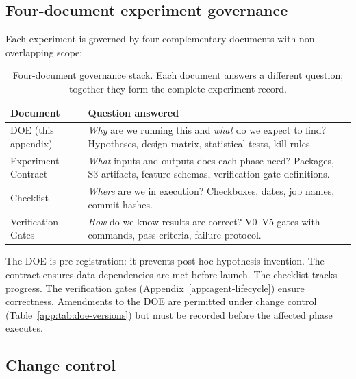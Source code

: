 \subsection{Four-document experiment governance}
\label{app:doe-governance}

Each experiment is governed by four complementary documents with
non-overlapping scope:

\begin{table}[t]
\centering
\caption{Four-document governance stack. Each document answers a different
  question; together they form the complete experiment record.}
\label{app:tab:four-docs}
\small
\begin{tabular}{@{}lp{5.0cm}@{}}
\toprule
\textbf{Document} & \textbf{Question answered} \\
\midrule
DOE (this appendix) &
  \emph{Why} are we running this and \emph{what} do we expect to find?
  Hypotheses, design matrix, statistical tests, kill rules. \\[4pt]
Experiment Contract &
  \emph{What} inputs and outputs does each phase need?
  Packages, S3 artifacts, feature schemas, verification gate definitions. \\[4pt]
Checklist &
  \emph{Where} are we in execution?
  Checkboxes, dates, job names, commit hashes. \\[4pt]
Verification Gates &
  \emph{How} do we know results are correct?
  V0--V5 gates with commands, pass criteria, failure protocol. \\
\bottomrule
\end{tabular}
\end{table}

The DOE is pre-registration: it prevents post-hoc hypothesis invention.
The contract ensures data dependencies are met before launch. The
checklist tracks progress. The verification gates (Appendix~\ref{app:agent-lifecycle})
ensure correctness. Amendments to the DOE are permitted under change
control (Table~\ref{app:tab:doe-versions}) but must be recorded before
the affected phase executes.

\subsection{Change control}
\label{app:doe-changes}

